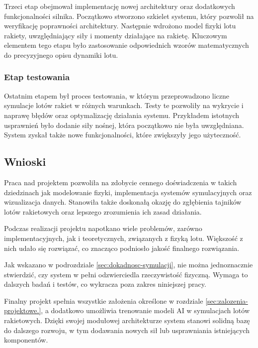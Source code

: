 Trzeci etap obejmował implementację nowej architektury oraz dodatkowych funkcjonalności silnika. Początkowo stworzono szkielet systemu, który pozwolił na weryfikację poprawności architektury. Następnie wdrożono model fizyki lotu rakiety, uwzględniający siły i momenty działające na rakietę. Kluczowym elementem tego etapu było zastosowanie odpowiednich wzorów matematycznych do precyzyjnego opisu dynamiki lotu.

\subsubsection{Etap testowania}

Ostatnim etapem był proces testowania, w którym przeprowadzono liczne symulacje lotów rakiet w różnych warunkach. Testy te pozwoliły na wykrycie i naprawę błędów oraz optymalizację działania systemu. Przykładem istotnych usprawnień było dodanie siły nośnej, która początkowo nie była uwzględniana. System zyskał także nowe funkcjonalności, które zwiększyły jego użyteczność.

\subsection{Wnioski}

Praca nad projektem pozwoliła na zdobycie cennego doświadczenia w takich dziedzinach jak modelowanie fizyki, implementacja systemów symulacyjnych oraz wizualizacja danych. Stanowiła także doskonałą okazję do zgłębienia tajników lotów rakietowych oraz lepszego zrozumienia ich zasad działania.

Podczas realizacji projektu napotkano wiele problemów, zarówno implementacyjnych, jak i teoretycznych, związanych z fizyką lotu. Większość z nich udało się rozwiązać, co znacząco podniosło jakość finalnego rozwiązania.

Jak wskazano w podrozdziale \ref{sec:dokadnosc-symulacji}, nie można jednoznacznie stwierdzić, czy system w pełni odzwierciedla rzeczywistość fizyczną. Wymaga to dalszych badań i testów, co wykracza poza zakres niniejszej pracy.

Finalny projekt spełnia wszystkie założenia określone w rozdziale \ref{sec:zalozenia-projektowe.}, a dodatkowo umożliwia trenowanie modeli AI w symulacjach lotów rakietowych. Dzięki swojej modułowej architekturze system stanowi solidną bazę do dalszego rozwoju, w tym dodawania nowych sił lub usprawniania istniejących komponentów.
